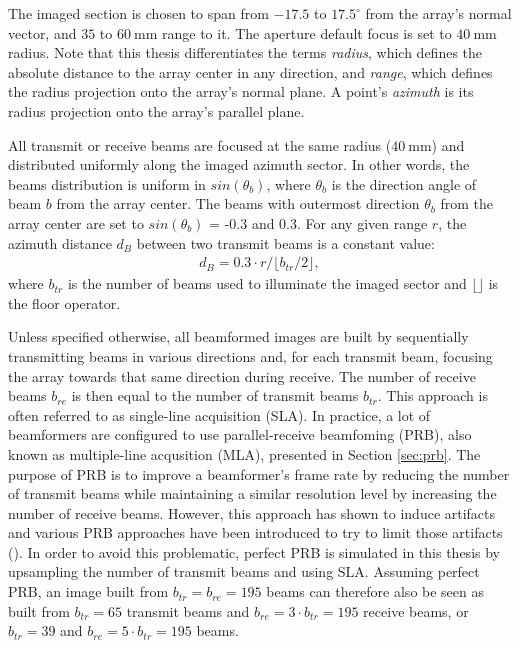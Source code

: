 The imaged section is chosen to span from $-17.5$ to $17.5^\circ$ from the array's normal vector, and $35$ to $60~$mm range to it. The aperture default focus is set to $40~$mm radius. Note that this thesis differentiates the terms \textit{radius}, which defines the absolute distance to the array center in any direction, and \textit{range}, which defines the radius projection onto the array's normal plane. A point's \textit{azimuth} is its radius projection onto the array's parallel plane.

All transmit or receive beams are focused at the same radius ($40~$mm) and distributed uniformly along the imaged azimuth sector. In other words, the beams distribution is uniform in $sin(\theta_b)$, where $\theta_b$ is the direction angle of beam $b$ from the array center.
The beams with outermost direction $\theta_b$ from the array center are set to $sin(\theta_b)$ = -0.3 and 0.3.
For any given range $r$, the azimuth distance $d_B$ between two transmit beams is a constant value:
\begin{align}
    d_B = 0.3 \cdot r / \lfloor b_{tr} / 2 \rfloor,
\label{eq:dist_beams}
\end{align}
\noindent
where $b_{tr}$ is the number of beams used to illuminate the imaged sector and $\lfloor \rfloor$ is the floor operator.

Unless specified otherwise, all beamformed images are built by sequentially transmitting beams in various directions and, for each transmit beam, focusing the array towards that same direction during receive. The number of receive beams $b_{re}$ is then equal to the number of transmit beams $b_{tr}$. This approach is often referred to as single-line acquisition (SLA).
In practice, a lot of beamformers are configured to use parallel-receive beamfoming (PRB), also known as multiple-line acqusition (MLA), presented in Section \ref{sec:prb}. The purpose of PRB is to improve a beamformer's frame rate by reducing the number of transmit beams while maintaining a similar resolution level by increasing the number of receive beams.
However, this approach has shown to induce artifacts and various PRB approaches have been introduced to try to limit those artifacts (\cite{multiline}).
In order to avoid this problematic, perfect PRB is simulated in this thesis by upsampling the number of transmit beams and using SLA. Assuming perfect PRB, an image built from $b_{tr} = b_{re} = 195$ beams can therefore also be seen as built from $b_{tr} = 65$ transmit beams and $b_{re} = 3 \cdot b_{tr} = 195$ receive beams, or $b_{tr} = 39$ and $b_{re} = 5 \cdot b_{tr} = 195$ beams.

